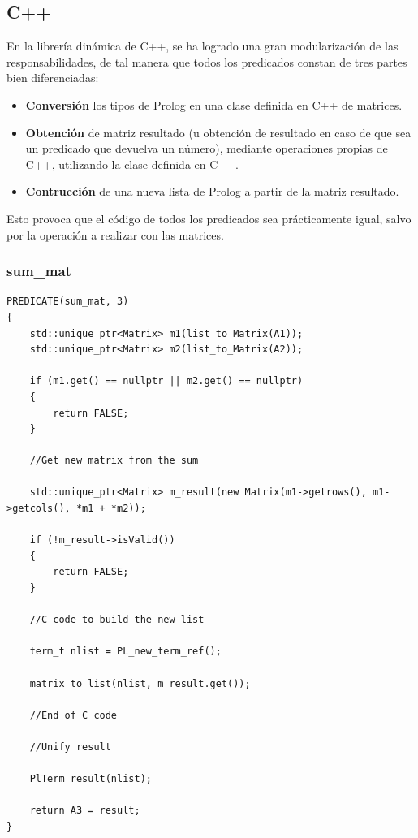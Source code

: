 \documentclass[a4paper]{article}
\begin{document}
\subsection{C++}

En la librería dinámica de C++, se ha logrado una gran modularización de las responsabilidades, de tal manera que todos los predicados constan de tres partes bien diferenciadas:
\begin{itemize}
\item \textbf{Conversión} los tipos de Prolog en una clase definida en C++ de matrices.
\item \textbf{Obtención} de matriz resultado (u obtención de resultado en caso de que sea un predicado que devuelva un número), mediante operaciones propias de C++, utilizando la clase definida en C++.
\item \textbf{Contrucción} de una nueva lista de Prolog a partir de la matriz resultado.
\end{itemize}

Esto provoca que el código de todos los predicados sea prácticamente igual, salvo por la operación a realizar con las matrices.
\subsubsection{sum\_mat}
\begin{lstlisting}[style=C++]
PREDICATE(sum_mat, 3)
{
    std::unique_ptr<Matrix> m1(list_to_Matrix(A1));
    std::unique_ptr<Matrix> m2(list_to_Matrix(A2));

    if (m1.get() == nullptr || m2.get() == nullptr)
    {
        return FALSE;
    }

    //Get new matrix from the sum
    
    std::unique_ptr<Matrix> m_result(new Matrix(m1->getrows(), m1->getcols(), *m1 + *m2));

    if (!m_result->isValid())
    {
        return FALSE;
    }
    
    //C code to build the new list

    term_t nlist = PL_new_term_ref();

    matrix_to_list(nlist, m_result.get());
    
    //End of C code

    //Unify result

    PlTerm result(nlist);
    
    return A3 = result;
}
\end{lstlisting}
\end{document}
